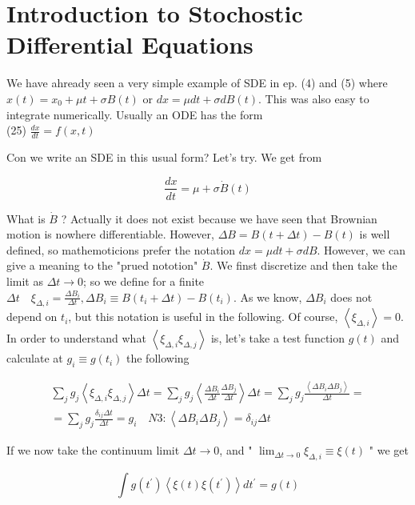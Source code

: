 \documentclass[10pt]{article}
\begin{document}
\section*{Introduction to Stochostic Differential Equations}
We have ahready seen a very simple example of SDE in ep. (4) and (5) where $x(t)=x_{0}+\mu t+\sigma B(t)$ or $d x=\mu d t+\sigma d B(t)$. This was also easy to integrate numerically. Usually an ODE has the form\\
(25) $\frac{d x}{d t}=f(x, t)$

Con we write an SDE in this usual form? Let's try. We get from

$$
\frac{d x}{d t}=\mu+\sigma \dot{B}(t)
$$

What is $\dot{B}$ ? Actually it does not exist because we have seen that Brownian motion is nowhere differentiable. However, $\Delta B=B(t+\Delta t)-B(t)$ is well defined, so mathemoticions prefer the notation $d x=\mu d t+\sigma d B$. However, we can give a meaning to the "prued nototion" $\dot{B}$. We finst discretize and then take the limit as $\Delta t \rightarrow 0$; so we define for a finite $\Delta t \quad \xi_{\Delta, i}=\frac{\Delta B_{i}}{\Delta t}, \Delta B_{i} \equiv B\left(t_{i}+\Delta t\right)-B\left(t_{i}\right)$. As we know, $\Delta B_{i}$ does not depend on $t_{i}$, but this notation is useful in the following. Of course, $\left\langle\xi_{\Delta, i}\right\rangle=0$. In order to understand what $\left\langle\xi_{\Delta, i} \xi_{\Delta, j}\right\rangle$ is, let's take a test function $g(t)$ and calculate at $g_{i} \equiv g\left(t_{i}\right)$ the following

$$
\begin{gathered}
\sum_{j} g_{j}\left\langle\xi_{\Delta, i} \xi_{\Delta, j}\right\rangle \Delta t=\sum_{j} g_{j}\left\langle\frac{\Delta B_{i}}{\Delta t} \frac{\Delta B_{j}}{\Delta t}\right\rangle \Delta t=\sum_{j} g_{j} \frac{\left\langle\Delta B_{i} \Delta B_{j}\right\rangle}{\Delta t}= \\
=\sum_{j} g_{j} \frac{\delta_{i j} \Delta t}{\Delta t}=g_{i} \quad N 3:\left\langle\Delta B_{i} \Delta B_{j}\right\rangle=\delta_{i j} \Delta t
\end{gathered}
$$

If we now take the continuum limit $\Delta t \rightarrow 0$, and " $\lim _{\Delta t \rightarrow 0} \xi_{\Delta, i} \equiv \xi(t)$ " we get

$$
\int g\left(t^{\prime}\right)\left\langle\xi(t) \xi\left(t^{\prime}\right)\right\rangle d t^{\prime}=g(t)
$$
\end{document}
